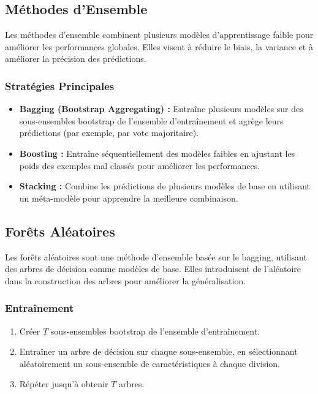 \documentclass[a4paper,portrait]{article}
\begin{document}
\begin{multicols}{2}
\subsection{Méthodes d'Ensemble}

Les méthodes d'ensemble combinent plusieurs modèles d'apprentissage faible pour améliorer les performances globales. Elles visent à réduire le biais, la variance et à améliorer la précision des prédictions.

\subsubsection{Stratégies Principales}
\begin{itemize}
    \item \textbf{Bagging (Bootstrap Aggregating) :} Entraîne plusieurs modèles sur des sous-ensembles bootstrap de l'ensemble d'entraînement et agrège leurs prédictions (par exemple, par vote majoritaire).
    \item \textbf{Boosting :} Entraîne séquentiellement des modèles faibles en ajustant les poids des exemples mal classés pour améliorer les performances.
    \item \textbf{Stacking :} Combine les prédictions de plusieurs modèles de base en utilisant un méta-modèle pour apprendre la meilleure combinaison.
\end{itemize}

\subsection{Forêts Aléatoires}

Les forêts aléatoires sont une méthode d'ensemble basée sur le bagging, utilisant des arbres de décision comme modèles de base. Elles introduisent de l'aléatoire dans la construction des arbres pour améliorer la généralisation.

\subsubsection{Entraînement}
\begin{enumerate}
    \item Créer \( T \) sous-ensembles bootstrap de l'ensemble d'entraînement.
    \item Entraîner un arbre de décision sur chaque sous-ensemble, en sélectionnant aléatoirement un sous-ensemble de caractéristiques à chaque division.
    \item Répéter jusqu'à obtenir \( T \) arbres.
\end{enumerate}


\end{multicols}
\end{document}
